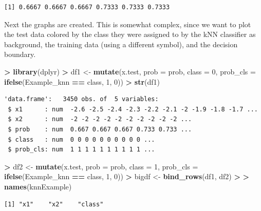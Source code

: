 \documentclass[]{krantz}
\makeatletter
\newenvironment{Shaded}{\begin{snugshade}}{\end{snugshade}}
\newcommand{\KeywordTok}[1]{\textcolor[rgb]{0.27,0.27,0.27}{\textbf{#1}}}
\newcommand{\DataTypeTok}[1]{\textcolor[rgb]{0.27,0.27,0.27}{#1}}
\newcommand{\DecValTok}[1]{\textcolor[rgb]{0.06,0.06,0.06}{#1}}
\newcommand{\StringTok}[1]{\textcolor[rgb]{0.5,0.5,0.5}{#1}}
\newcommand{\OperatorTok}[1]{\textcolor[rgb]{0.43,0.43,0.43}{\textbf{#1}}}
\newcommand{\ErrorTok}[1]{\textcolor[rgb]{0.14,0.14,0.14}{\textbf{#1}}}
\newcommand{\NormalTok}[1]{#1}
\newenvironment{kframe}{%
\medskip{}
\setlength{\fboxsep}{.8em}
 \def\at@end@of@kframe{}%
 \ifinner\ifhmode%
  \def\at@end@of@kframe{\end{minipage}}%
  \begin{minipage}{\columnwidth}%
 \fi\fi%
 \def\FrameCommand##1{\hskip\@totalleftmargin \hskip-\fboxsep
 \colorbox{shadecolor}{##1}\hskip-\fboxsep
     \hskip-\linewidth \hskip-\@totalleftmargin \hskip\columnwidth}%
 \MakeFramed {\advance\hsize-\width
   \@totalleftmargin\z@ \linewidth\hsize
   \@setminipage}}%
 {\par\unskip\endMakeFramed%
 \at@end@of@kframe}
\renewenvironment{Shaded}{\begin{kframe}}{\end{kframe}}
\makeatother
\begin{document}
\begin{verbatim}
[1] 0.6667 0.6667 0.6667 0.7333 0.7333 0.7333
\end{verbatim}

Next the graphs are created. This is somewhat complex, since we want to
plot the test data colored by the class they were assigned to by the kNN
classifier as background, the training data (using a different symbol),
and the decision boundary.

\begin{Shaded}
\begin{Highlighting}[]
\OperatorTok{>}\StringTok{ }\KeywordTok{library}\NormalTok{(dplyr)}
\OperatorTok{>}\StringTok{ }\NormalTok{df1 <-}\StringTok{ }\KeywordTok{mutate}\NormalTok{(x.test, }\DataTypeTok{prob =}\NormalTok{ prob, }\DataTypeTok{class =} \DecValTok{0}\NormalTok{,  }\DataTypeTok{prob_cls =} \KeywordTok{ifelse}\NormalTok{(Example_knn }\OperatorTok{==}\StringTok{ }\NormalTok{class, }\DecValTok{1}\NormalTok{, }\DecValTok{0}\NormalTok{))}
\OperatorTok{>}\StringTok{ }\KeywordTok{str}\NormalTok{(df1)}
\end{Highlighting}
\end{Shaded}

\begin{verbatim}
'data.frame':   3450 obs. of  5 variables:
 $ x1      : num  -2.6 -2.5 -2.4 -2.3 -2.2 -2.1 -2 -1.9 -1.8 -1.7 ...
 $ x2      : num  -2 -2 -2 -2 -2 -2 -2 -2 -2 -2 ...
 $ prob    : num  0.667 0.667 0.667 0.733 0.733 ...
 $ class   : num  0 0 0 0 0 0 0 0 0 0 ...
 $ prob_cls: num  1 1 1 1 1 1 1 1 1 1 ...
\end{verbatim}

\begin{Shaded}
\begin{Highlighting}[]
\OperatorTok{>}\StringTok{ }\NormalTok{df2 <-}\StringTok{ }\KeywordTok{mutate}\NormalTok{(x.test, }\DataTypeTok{prob =}\NormalTok{ prob, }\DataTypeTok{class =} \DecValTok{1}\NormalTok{,  }\DataTypeTok{prob_cls =} \KeywordTok{ifelse}\NormalTok{(Example_knn }\OperatorTok{==}\StringTok{ }\NormalTok{class, }\DecValTok{1}\NormalTok{, }\DecValTok{0}\NormalTok{))}
\OperatorTok{>}\StringTok{ }\NormalTok{bigdf <-}\StringTok{ }\KeywordTok{bind_rows}\NormalTok{(df1, df2)}
\OperatorTok{>}\StringTok{ }
\ErrorTok{>}\StringTok{ }\KeywordTok{names}\NormalTok{(knnExample)}
\end{Highlighting}
\end{Shaded}

\begin{verbatim}
[1] "x1"    "x2"    "class"
\end{verbatim}
\end{document}
